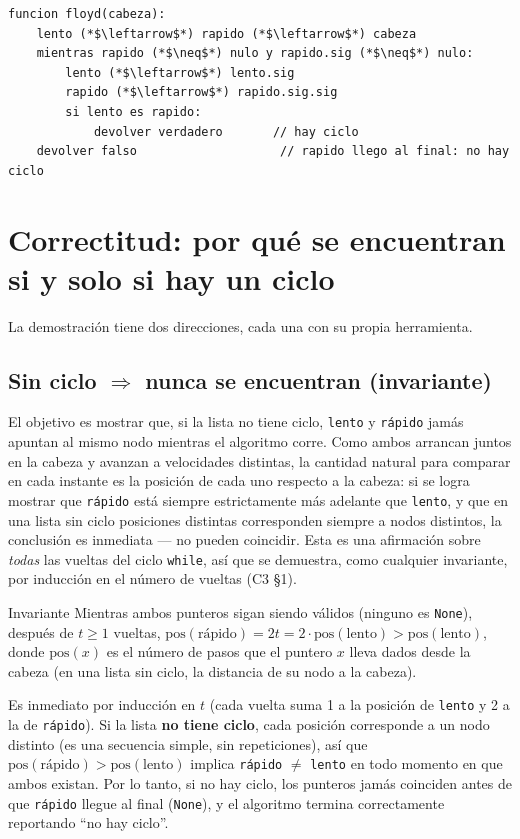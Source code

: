 \documentclass[11pt]{article}
\begin{document}
\begin{lstlisting}[style=pseudo]
funcion floyd(cabeza):
    lento (*$\leftarrow$*) rapido (*$\leftarrow$*) cabeza
    mientras rapido (*$\neq$*) nulo y rapido.sig (*$\neq$*) nulo:
        lento (*$\leftarrow$*) lento.sig
        rapido (*$\leftarrow$*) rapido.sig.sig
        si lento es rapido:
            devolver verdadero       // hay ciclo
    devolver falso                    // rapido llego al final: no hay ciclo
\end{lstlisting}

\section{Correctitud: por qué se encuentran si y solo si hay un ciclo}

La demostración tiene dos direcciones, cada una con su propia herramienta.

\subsection*{Sin ciclo $\Rightarrow$ nunca se encuentran (invariante)}

El objetivo es mostrar que, si la lista no tiene ciclo, \texttt{lento} y \texttt{rápido} jamás apuntan al
mismo nodo mientras el algoritmo corre. Como ambos arrancan juntos en la cabeza y avanzan a velocidades
distintas, la cantidad natural para comparar en cada instante es la posición de cada uno respecto a la
cabeza: si se logra mostrar que \texttt{rápido} está siempre estrictamente más adelante que \texttt{lento},
y que en una lista sin ciclo posiciones distintas corresponden siempre a nodos distintos, la conclusión es
inmediata --- no pueden coincidir. Esta es una afirmación sobre \emph{todas} las vueltas del ciclo
\texttt{while}, así que se demuestra, como cualquier invariante, por inducción en el número de vueltas
(C3 §1).

\begin{resultado}{Invariante}
Mientras ambos punteros sigan siendo válidos (ninguno es \texttt{None}), después de $t\ge 1$ vueltas,
$\mathrm{pos}(\text{rápido}) = 2t = 2\cdot\mathrm{pos}(\mathrm{lento}) > \mathrm{pos}(\mathrm{lento})$,
donde $\mathrm{pos}(x)$ es el número de pasos que el puntero $x$ lleva dados desde la cabeza (en una lista
sin ciclo, la distancia de su nodo a la cabeza).
\end{resultado}

Es inmediato por inducción en $t$ (cada vuelta suma 1 a la posición de \texttt{lento} y 2 a la de
\texttt{rápido}). Si la lista \textbf{no tiene ciclo}, cada posición corresponde a un nodo distinto (es una
secuencia simple, sin repeticiones), así que $\mathrm{pos}(\text{rápido})>\mathrm{pos}(\mathrm{lento})$
implica \texttt{rápido} $\ne$ \texttt{lento} en todo momento en que ambos existan. Por lo tanto, si no hay
ciclo, los punteros jamás coinciden antes de que \texttt{rápido} llegue al final (\texttt{None}), y el
algoritmo termina correctamente reportando ``no hay ciclo''.
\end{document}
